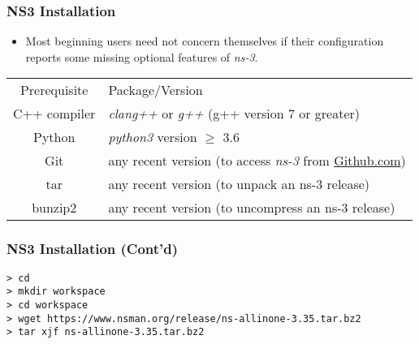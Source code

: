 \documentclass{../iot-lecture}
\begin{document}
\begin{frame}
  \frametitle{NS3 Installation}
  \begin{itemize}
    \item Most beginning users need not concern themselves if their configuration reports some missing
      optional features of \textit{ns-3}.
  \end{itemize}
  \begin{table}
    \begin{tabular}{cp{}}
      Prerequisite &
      Package/Version \\

      C++ compiler &
      \textit{clang++} or \textit{g++} (g++ version 7 or greater) \\

      Python &
      \textit{python3} version $\geq$ 3.6 \\

      Git &
      any recent version (to access \textit{ns-3} from \href{https://github.com/nsnam/ns-3-dev-git}{Github.com}) \\

      tar &
      any recent version (to unpack an ns-3 release) \\

      bunzip2 &
      any recent version (to uncompress an ns-3 release) \\
    \end{tabular}
  \end{table}
\end{frame}

\begin{frame}
  \frametitle{NS3 Installation (Cont'd)}
  \begin{verbatim}
> cd
> mkdir workspace
> cd workspace
> wget https://www.nsman.org/release/ns-allinone-3.35.tar.bz2
> tar xjf ns-allinone-3.35.tar.bz2
  \end{verbatim}
\end{frame}
\end{document}
